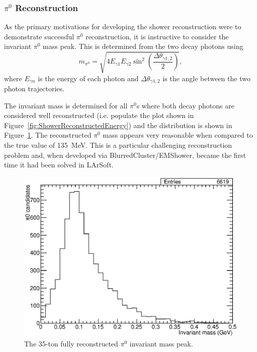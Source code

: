 \subsubsection{$\pi^0$ Reconstruction}\label{sec:pi0Reconstruction}

As the primary motivations for developing the shower reconstruction were to demonstrate successful $\pi^0$ reconstruction, it is instructive to consider the invariant $\pi^0$ mass peak.  This is determined from the two decay photons using
\begin{equation}
  m_{\pi^0} = \sqrt{4 E_{\gamma 1} E_{\gamma 2} \sin^2{\left( \frac{\Delta \theta_{\gamma 1,2}}{2} \right)}},
\end{equation}
where $E_{\gamma n}$ is the energy of each photon and $\Delta \theta_{\gamma 1,2}$ is the angle between the two photon trajectories.

The invariant mass is determined for all $\pi^0$s where both decay photons are considered well reconstructed (i.e. populate the plot shown in Figure~\ref{fig:ShowerReconstructedEnergy}) and the distribution is shown in Figure~\ref{fig:Pi0MassPeak}.  The reconstructed $\pi^0$ mass appears very reasonable when compared to the true value of 135~MeV.  This is a particular challenging reconstruction problem and, when developed via BlurredCluster/EMShower, became the first time it had been solved in LArSoft.

\begin{figure}
  \centering
  \includegraphics[width=12cm]{Pi0MassPeak.eps}
  \caption[The 35-ton fully reconstructed $\pi^0$ invariant mass peak.]{The 35-ton fully reconstructed $\pi^0$ invariant mass peak.}
  \label{fig:Pi0MassPeak}
\end{figure}

